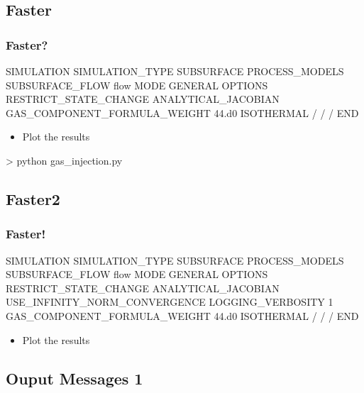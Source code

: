 \documentclass{beamer}
\begin{document}
\subsection{Faster}
\begin{frame}[fragile]\frametitle{Faster?}

\begin{semiverbatim}
SIMULATION
  SIMULATION_TYPE SUBSURFACE
  PROCESS_MODELS
    SUBSURFACE_FLOW flow
      MODE GENERAL 
      OPTIONS
        RESTRICT_STATE_CHANGE
        ANALYTICAL_JACOBIAN
        GAS_COMPONENT_FORMULA_WEIGHT 44.d0 
        ISOTHERMAL 
      /
    /
  /
END
\end{semiverbatim}

\begin{itemize}
  \item Plot the results
\end{itemize}

\begin{semiverbatim}
> python gas_injection.py
\end{semiverbatim}

\end{frame}

\subsection{Faster2}
\begin{frame}[fragile]\frametitle{Faster!}

\begin{semiverbatim}
SIMULATION
  SIMULATION_TYPE SUBSURFACE
  PROCESS_MODELS
    SUBSURFACE_FLOW flow
      MODE GENERAL 
      OPTIONS
        RESTRICT_STATE_CHANGE
        ANALYTICAL_JACOBIAN
        USE_INFINITY_NORM_CONVERGENCE
        LOGGING_VERBOSITY 1
	GAS_COMPONENT_FORMULA_WEIGHT 44.d0 
        ISOTHERMAL 
      /
    /
  /
END
\end{semiverbatim}

\begin{itemize}
  \item Plot the results
\end{itemize}

\end{frame}
\subsection{Ouput Messages 1}
\end{document}
